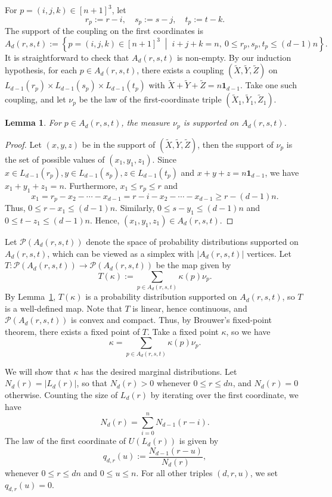 \documentclass{article}
\newcommand{\setcond}[2]{\left\{ #1 \;\middle\vert\; #2 \right\}}
\newcommand{\cP}{\mathcal{P}}
\newcommand{\ones}{\mathbf{1}}
\newtheorem{lem}[thm]{Lemma}
\theoremstyle{definition}
\begin{document}
For $p=(i,j,k)\in [n+1]^3$, let 
\[r_p := r-i,\quad s_p := s-j,\quad t_p := t-k.\]
The support of the coupling on the first coordinates is
\[A_{d}(r,s,t) := \setcond{p=(i,j,k)\in [n+1]^3}{i+j+k=n,\ 0\leq r_p,s_p,t_p\leq (d-1)n}.\]
It is straightforward to check that $A_{d}(r,s,t)$ is non-empty. By our induction hypothesis, for each $p\in A_{d}(r,s,t)$, there exists a coupling $(\tilde{X},\tilde{Y},\tilde{Z})$ on $L_{d-1}(r_p)\times L_{d-1}(s_p)\times L_{d-1}(t_p)$ with $\tilde{X}+\tilde{Y}+\tilde{Z}=n\ones_{d-1}$. Take one such coupling, and let $\nu_p$ be the law of the first-coordinate triple $(\tilde{X}_1,\tilde{Y}_1,\tilde{Z}_1)$. 
\begin{lem} \label{lem:nu-support}
    For $p\in A_{d}(r,s,t)$, the measure $\nu_p$ is supported on $A_{d}(r,s,t)$.
\end{lem}
\begin{proof}
    Let $(x,y,z)$ be in the support of $(\tilde{X},\tilde{Y},\tilde{Z})$, then the support of $\nu_p$ is the set of possible values of $(x_1,y_1,z_1)$. Since $x\in L_{d-1}(r_p), y\in L_{d-1}(s_p), z\in L_{d-1}(t_p)$ and $x+y+z=n\ones_{d-1}$, we have $x_1+y_1+z_1=n$. Furthermore, $x_1\leq r_p\leq r$ and 
    \[x_1=r_p-x_2-\cdots -x_{d-1}=r-i-x_2-\cdots -x_{d-1}\geq r-(d-1)n.\]
    Thus, $0\leq r-x_1\leq (d-1)n$. Similarly, $0\leq s-y_1\leq (d-1)n$ and $0\leq t-z_1\leq (d-1)n$. Hence, $(x_1,y_1,z_1)\in A_{d}(r,s,t)$.
\end{proof}

Let $\cP(A_{d}(r,s,t))$ denote the space of probability distributions supported on $A_{d}(r,s,t)$, which can be viewed as a simplex with $|A_{d}(r,s,t)|$ vertices. Let $T:\cP(A_{d}(r,s,t))\to \cP(A_{d}(r,s,t))$ be the map given by
\[T(\kappa) := \sum_{p\in A_{d}(r,s,t)} \kappa(p) \nu_p.\]
By Lemma~\ref{lem:nu-support}, $T(\kappa)$ is a probability distribution supported on $A_{d}(r,s,t)$, so $T$ is a well-defined map. Note that $T$ is linear, hence continuous, and $\cP(A_{d}(r,s,t))$ is convex and compact. Thus, by Brouwer's fixed-point theorem, there exists a fixed point of $T$. Take a fixed point $\kappa$, so we have
\begin{equation} \label{eq:kappa}
    \kappa = \sum_{p\in A_{d}(r,s,t)} \kappa(p) \nu_p.
\end{equation}

We will show that $\kappa$ has the desired marginal distributions. Let $N_{d}(r)=|L_{d}(r)|$, so that $N_{d}(r)>0$ whenever $0\leq r\leq dn$, and $N_d(r)=0$ otherwise. Counting the size of $L_{d}(r)$ by iterating over the first coordinate, we have 
\begin{equation} \label{eq:N-sum}
    N_{d}(r) = \sum_{i=0}^n N_{d-1}(r-i).
\end{equation}
The law of the first coordinate of $U(L_{d}(r))$ is given by
\[q_{d,r}(u) := \frac{N_{d-1}(r-u)}{N_{d}(r)},\]
whenever $0\leq r\leq dn$ and $0\leq u\leq n$. For all other triples $(d,r,u)$, we set $q_{d,r}(u)=0$. 
\end{document}
